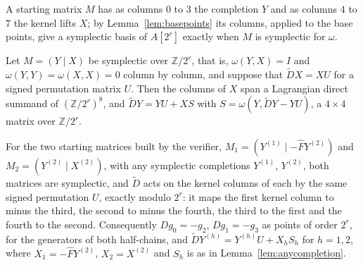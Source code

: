 \documentclass[version=preprint]{iacrcc}
\begin{document}
    A starting matrix $M$ has as columns $0$ to $3$ the completion $Y$ and as
    columns $4$ to $7$ the kernel lifts $X$; by Lemma~\ref{lem:basepoints} its
    columns, applied to the base points, give a symplectic basis of $A[2^r]$
    exactly when $M$ is symplectic for $\omega$.

    \begin{lemma}
        \label{lem:anycompletion}
        Let $M = (Y \mid X)$ be symplectic over $\mathbb Z/2^r$, that is,
        $\omega(Y, X) = I$ and $\omega(Y, Y) = \omega(X, X) = 0$ column by column,
        and suppose that $\tilde D X = X U$ for a signed permutation matrix $U$.
        Then the columns of $X$ span a Lagrangian direct summand of $(\mathbb
        Z/2^r)^8$, and $\tilde D Y = Y U + X S$ with $S = \omega(Y, \tilde D Y -
        YU)$, a $4 \times 4$ matrix over $\mathbb Z/2^r$.
    \end{lemma}


    \begin{lemma}
        \label{lem:paired}
        For the two starting matrices built by the verifier, $M_1 = (Y^{(1)} \mid
        -\widehat F Y^{(2)})$ and $M_2 = (Y^{(2)} \mid X^{(2)})$, with any
        symplectic completions $Y^{(1)}$, $Y^{(2)}$, both matrices are symplectic,
        and $\tilde D$ acts on the kernel columns of each by the same signed
        permutation $U$, exactly modulo $2^r$: it maps the first kernel column to
        minus the third, the second to minus the fourth, the third to the first
        and the fourth to the second. Consequently $D g_0 = -g_2$, $D g_1 =
        -g_3$ as points of order $2^r$, for the generators of both half-chains,
        and $\tilde D Y^{(h)} = Y^{(h)} U + X_h S_h$ for $h = 1, 2$, where $X_1 =
        -\widehat F Y^{(2)}$, $X_2 = X^{(2)}$ and $S_h$ is as in
        Lemma~\ref{lem:anycompletion}.
    \end{lemma}
\end{document}
